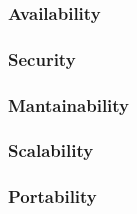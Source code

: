 \subsubsection{Availability}
\subsubsection{Security}
\subsubsection{Mantainability}
\subsubsection{Scalability}
\subsubsection{Portability}